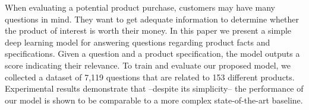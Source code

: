When evaluating a potential product purchase, customers may have many questions in mind. They want to get adequate information to determine whether the product of interest is worth their money. In this paper we present a simple deep learning model for answering questions regarding product facts and specifications. Given a question and a product specification, the model outputs a score indicating their relevance. To train and evaluate our proposed model, we collected a dataset of 7,119 questions that are related to 153 different products. Experimental results demonstrate that --despite its simplicity-- the performance of our model is shown to be comparable to a more complex state-of-the-art baseline.
